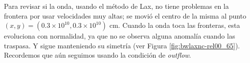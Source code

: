 \documentclass[12pt,a4paper]{book}
\begin{document}
Para revisar si la onda, usando el método de Lax, no tiene problemas en la frontera por usar velocidades muy altas; se movió el centro de la misma al punto $(x,y) = (0.3 \times 10^{10}, 0.3 \times 10^{10})$ cm. Cuando la onda toca las fronteras, esta evoluciona con normalidad, ya que no se observa alguna anomalía cuando las traspasa. Y sigue manteniendo su simetría (ver Figura \ref{fig:bwlaxnc-rel00_65}). Recordemos que aún seguimos usando la condición de \emph{outflow}.

\begin{figure}
\centering
{}

\end{figure}
\end{document}
